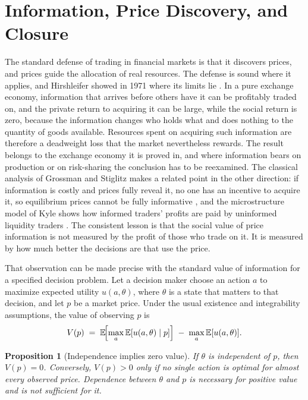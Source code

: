 \documentclass[11pt]{article}
\newtheorem{proposition}{Proposition}
\theoremstyle{remark}
\newcommand{\E}{\mathbb{E}}
\begin{document}
\section{Information, Price Discovery, and Closure}\label{sec:information}

The standard defense of trading in financial markets is that it discovers prices, and prices guide the allocation of real resources. The defense is sound where it applies, and Hirshleifer showed in 1971 where its limits lie \cite{hirshleifer1971}. In a pure exchange economy, information that arrives before others have it can be profitably traded on, and the private return to acquiring it can be large, while the social return is zero, because the information changes who holds what and does nothing to the quantity of goods available. Resources spent on acquiring such information are therefore a deadweight loss that the market nevertheless rewards. The result belongs to the exchange economy it is proved in, and where information bears on production or on risk-sharing the conclusion has to be reexamined. The classical analysis of Grossman and Stiglitz makes a related point in the other direction: if information is costly and prices fully reveal it, no one has an incentive to acquire it, so equilibrium prices cannot be fully informative \cite{grossman1980}, and the microstructure model of Kyle shows how informed traders' profits are paid by uninformed liquidity traders \cite{kyle1985}. The consistent lesson is that the social value of price information is not measured by the profit of those who trade on it. It is measured by how much better the decisions are that use the price.

That observation can be made precise with the standard value of information for a specified decision problem. Let a decision maker choose an action $a$ to maximize expected utility $u(a,\theta)$, where $\theta$ is a state that matters to that decision, and let $p$ be a market price. Under the usual existence and integrability assumptions, the value of observing $p$ is
\[
V(p)\;=\;\E\!\Bigl[\max_a \E[u(a,\theta)\mid p]\Bigr]\;-\;\max_a \E[u(a,\theta)] .
\]

\begin{proposition}[Independence implies zero value]\label{prop:coupling}
If $\theta$ is independent of $p$, then $V(p)=0$. Conversely, $V(p)>0$ only if no single action is optimal for almost every observed price. Dependence between $\theta$ and $p$ is necessary for positive value and is not sufficient for it.
\end{proposition}
\end{document}
